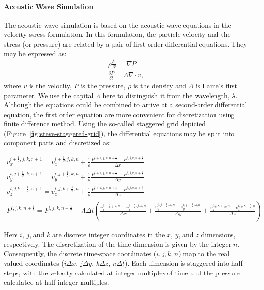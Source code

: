 \paragraph{Acoustic Wave Simulation}
The acoustic wave simulation is based on the acoustic wave equations in the
velocity stress formulation. In this formulation, the particle velocity and the
stress (or pressure) are related by a pair of first order differential
equations. They may be expressed as:
\begin{align*}
\rho \frac{\delta v}{\delta t} = \nabla P\\
\frac{\delta P}{\delta t} = \Lambda \nabla \cdot v,
\end{align*}
where $v$ is the velocity, $P$ is the pressure, $\rho$ is the density and
$\Lambda$ is Lame's first parameter.  We use the capital $\Lambda$ here to
distinguish it from the wavelength, $\lambda$. Although the equations could be
combined to arrive at a second-order differential equation, the first order
equation are more convenient for discretization using finite difference method.
Using the so-called staggered grid depicted (Figure~\ref{fig:steve-staggered-grid}), the differential
equations may be split into component parts and discretized as:

\begin{gather*}
    v_x^{i+\frac{1}{2},j,k,n+1} = v_x^{i+\frac{1}{2},j,k,n} + \frac{1}{\rho}\frac{P^{i+1,j,k,n+\frac{1}{2}}-P^{i,j,k,n+\frac{1}{2}}}{\Delta x}\\
    v_y^{i,j+\frac{1}{2},k,n+1} = v_y^{i,j+\frac{1}{2},k,n} + \frac{1}{\rho}\frac{P^{i+1,j,k,n+\frac{1}{2}}-P^{i,j,k,n+\frac{1}{2}}}{\Delta y}\\
    v_z^{i,j,k+\frac{1}{2},n+1} = v_z^{i,j,k+\frac{1}{2},n} + \frac{1}{\rho}\frac{P^{i+1,j,k,n+\frac{1}{2}}-P^{i,j,k,n+\frac{1}{2}}}{\Delta z}\\
    P^{i,j,k,n+\frac{1}{2}} = P^{i,j,k,n-\frac{1}{2}} + \Lambda \Delta t 
\left( 
    \frac{v_x^{i+\frac{1}{2},j,k,n}  - v_x^{i-\frac{1}{2},j,k,n}}{\Delta x} +
    \frac{v_y^{i,j+\frac{1}{2},k,n}  - v_y^{i,j-\frac{1}{2},k,n}}{\Delta y} +
    \frac{v_z^{i,j,k+\frac{1}{2},n}  - v_z^{i,j,k-\frac{1}{2},n}}{\Delta z}
\right)
\end{gather*}

Here $i$, $j$, and $k$ are discrete integer coordinates in the $x$, $y$, and
$z$ dimensions, respectively. The discretization of the time dimension is given
by the integer $n$. Consequently, the discrete time-space coordinates ($i, j,
k, n$) map to the real valued coordinates ($i \Delta x$, $j \Delta y$, $k\Delta
z$, $n \Delta t$). Each dimension is staggered into half steps, with the
velocity calculated at integer multiples of time and the pressure calculated at
half-integer multiples. 


